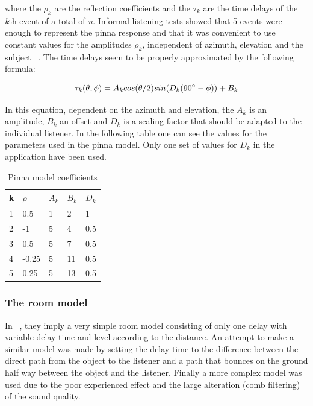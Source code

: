 \documentclass[journal]{IEEEtran}
\begin{document}
where the $\rho_{k}$ are the reflection coefficients and the $\tau_{k}$ are the time delays of the \textit{k}th event of a total of \textit{n}. Informal listening tests showed that 5 events were enough to represent the pinna response and that it was convenient to use constant values for the amplitudes $\rho_{k}$,  independent of azimuth, elevation and the subject ~\cite{Brown1997}. The time delays seem to be properly approximated by the following formula:

\begin{equation}\label{eq:pinna}
\tau_{k}(\theta,\phi) = A_{k}cos(\theta/2)sin(D_{k}(90\degree-\phi)) + B_{k}
\end{equation} 

In this equation, dependent on the azimuth and elevation, the $A_{k}$ is an amplitude, $B_{k}$ an offset and $D_{k}$ is a scaling factor that should be adapted to the individual listener. 
In the following table one can see the values for the parameters used in the pinna model. Only one set of values for $D_{k}$ in the application have been used.

\begin{table}[h]
\centering
\caption{Pinna model coefficients}
\label{PinnaModel parameters}
\begin{tabular}{|l|l|l|l|l|}
\hline
k & $\rho$  & $A_{k}$ & $B_{k}$  & $D_{k}$   \\ \hline
1 & 0.5   & 1 & 2  & 1   \\ \hline
2 & -1    & 5 & 4  & 0.5 \\ \hline
3 & 0.5   & 5 & 7  & 0.5 \\ \hline
4 & -0.25 & 5 & 11 & 0.5 \\ \hline
5 & 0.25  & 5 & 13 & 0.5 \\ \hline
\end{tabular}
\end{table}



\subsubsection{The room model}
In ~\cite{Brown1997}, they imply a very simple room model consisting of only one delay with variable delay time and level according to the distance. An attempt to make a similar model was made by setting the delay time to the difference between the direct path from the object to the listener and a path that bounces on the ground half way between the object and the listener. Finally a more complex model was used due to the poor experienced effect and the large alteration (comb filtering) of the sound quality.
\end{document}
